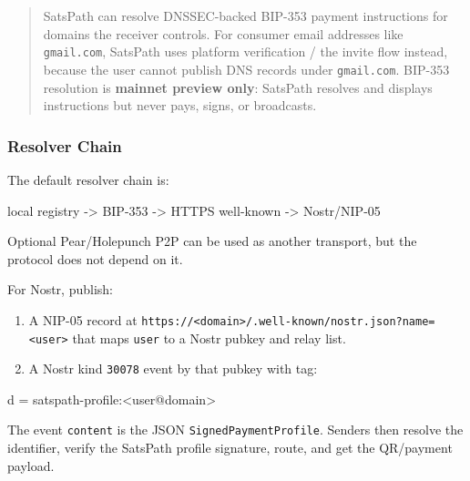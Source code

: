 \documentclass[
]{article}
\newenvironment{Shaded}{}{}
\newcommand{\NormalTok}[1]{#1}
\providecommand{\tightlist}{%
  \setlength{\itemsep}{0pt}\setlength{\parskip}{0pt}}
\begin{document}
\begin{quote}
SatsPath can resolve DNSSEC-backed BIP-353 payment instructions for
domains the receiver controls. For consumer email addresses like
\texttt{gmail.com}, SatsPath uses platform verification / the invite
flow instead, because the user cannot publish DNS records under
\texttt{gmail.com}. BIP-353 resolution is \textbf{mainnet preview only}:
SatsPath resolves and displays instructions but never pays, signs, or
broadcasts.
\end{quote}

\hypertarget{resolver-chain}{%
\subsubsection{Resolver Chain}\label{resolver-chain}}

The default resolver chain is:

\begin{Shaded}
\begin{Highlighting}[]
\NormalTok{local registry {-}\textgreater{} BIP{-}353 {-}\textgreater{} HTTPS well{-}known {-}\textgreater{} Nostr/NIP{-}05}
\end{Highlighting}
\end{Shaded}

Optional Pear/Holepunch P2P can be used as another transport, but the
protocol does not depend on it.

For Nostr, publish:

\begin{enumerate}
\def\labelenumi{\arabic{enumi}.}
\tightlist
\item
  A NIP-05 record at
  \texttt{https://\textless{}domain\textgreater{}/.well-known/nostr.json?name=\textless{}user\textgreater{}}
  that maps \texttt{user} to a Nostr pubkey and relay list.
\item
  A Nostr kind \texttt{30078} event by that pubkey with tag:
\end{enumerate}

\begin{Shaded}
\begin{Highlighting}[]
\NormalTok{d = satspath{-}profile:\textless{}user@domain\textgreater{}}
\end{Highlighting}
\end{Shaded}

The event \texttt{content} is the JSON \texttt{SignedPaymentProfile}.
Senders then resolve the identifier, verify the SatsPath profile
signature, route, and get the QR/payment payload.
\end{document}
